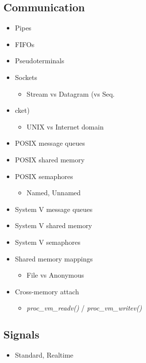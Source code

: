 \documentclass[../../lectures.tex]{subfiles}
\begin{document}
\subsection{Communication}
\begin{itemize}
    \item Pipes
    \item FIFOs
    \item Pseudoterminals
    \item Sockets
          \begin{itemize}
            \item Stream vs Datagram (vs Seq.
          \end{itemize}
    \item cket)
          \begin{itemize}
            \item UNIX vs Internet domain
          \end{itemize}
    \item POSIX message queues
    \item POSIX shared memory
    \item POSIX semaphores
          \begin{itemize}
            \item Named, Unnamed
          \end{itemize}
    \item System V message queues
    \item System V shared memory
    \item System V semaphores
    \item Shared memory mappings
          \begin{itemize}
            \item File vs Anonymous
          \end{itemize}
    \item Cross-memory attach
          \begin{itemize}
            \item \emph{proc\_vm\_readv()} / \emph{proc\_vm\_writev()}
          \end{itemize}
\end{itemize}

\subsection{Signals}
\begin{itemize}
    \item Standard, Realtime
\end{itemize}
\end{document}
